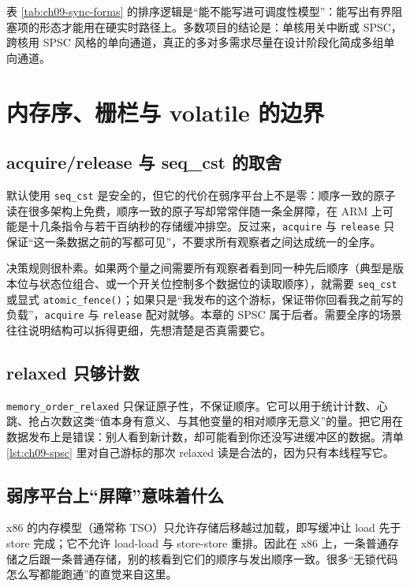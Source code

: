 \documentclass[12pt,a4paper,fontset=fandol]{ctexbook}
\newcommand{\Fn}[1]{\texttt{#1()}}
\newcommand{\Tp}[1]{\texttt{#1}}
\begin{document}
表 \ref{tab:ch09-sync-forms} 的排序逻辑是“能不能写进可调度性模型”：能写出有界阻塞项的形态才能用在硬实时路径上。多数项目的结论是：单核用关中断或 SPSC，跨核用 SPSC 风格的单向通道，真正的多对多需求尽量在设计阶段化简成多组单向通道。

\section{内存序、栅栏与 volatile 的边界}

\subsection*{acquire/release 与 seq\_cst 的取舍}

默认使用 \Tp{seq\_cst} 是安全的，但它的代价在弱序平台上不是零：顺序一致的原子读在很多架构上免费，顺序一致的原子写却常常伴随一条全屏障，在 ARM 上可能是十几条指令与若干百纳秒的存储缓冲排空。反过来，\Tp{acquire} 与 \Tp{release} 只保证“这一条数据之前的写都可见”，不要求所有观察者之间达成统一的全序。

决策规则很朴素。如果两个量之间需要所有观察者看到同一种先后顺序（典型是版本位与状态位组合、或一个开关位控制多个数据位的读取顺序），就需要 \Tp{seq\_cst} 或显式 \Fn{atomic\_fence}；如果只是“我发布的这个游标，保证带你回看我之前写的负载”，\Tp{acquire} 与 \Tp{release} 配对就够。本章的 SPSC 属于后者。需要全序的场景往往说明结构可以拆得更细，先想清楚是否真需要它。

\subsection*{relaxed 只够计数}

\Tp{memory\_order\_relaxed} 只保证原子性，不保证顺序。它可以用于统计计数、心跳、抢占次数这类“值本身有意义、与其他变量的相对顺序无意义”的量。把它用在数据发布上是错误：别人看到新计数，却可能看到你还没写进缓冲区的数据。清单 \ref{lst:ch09-spsc} 里对自己游标的那次 relaxed 读是合法的，因为只有本线程写它。

\subsection*{弱序平台上“屏障”意味着什么}

x86 的内存模型（通常称 TSO）只允许存储后移越过加载，即写缓冲让 load 先于 store 完成；它不允许 load-load 与 store-store 重排。因此在 x86 上，一条普通存储之后跟一条普通存储，别的核看到它们的顺序与发出顺序一致。很多“无锁代码怎么写都能跑通”的直觉来自这里。
\end{document}
